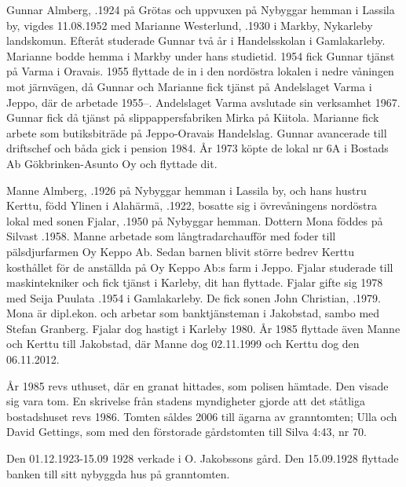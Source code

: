 Gunnar Almberg, .1924 på Grötas och uppvuxen på Nybyggar hemman i Lassila by, vigdes 11.08.1952 med Marianne Westerlund, .1930 i Markby, Nykarleby landskomun. Efteråt studerade Gunnar två år i Handelsskolan i Gamlakarleby. Marianne bodde hemma i Markby under hans studietid. 1954 fick Gunnar tjänst på Varma i Oravais. 1955 flyttade de in i den nordöstra lokalen i nedre våningen mot järnvägen, då Gunnar och Marianne fick tjänst på Andelslaget Varma i Jeppo, där de arbetade 1955--. Andelslaget Varma avslutade sin verksamhet 1967. Gunnar fick då tjänst på slippappersfabriken Mirka på Kiitola. Marianne fick arbete som butiksbiträde på Jeppo-Oravais Handelslag. Gunnar avancerade till driftschef och båda gick i pension 1984. År 1973 köpte de lokal nr 6A i Bostads Ab Gökbrinken-Asunto Oy och flyttade dit.

Manne Almberg, .1926 på Nybyggar hemman i Lassila by, och hans hustru Kerttu, född Ylinen i Alahärmä, .1922, bosatte sig i övrevåningens nordöstra lokal med sonen Fjalar, .1950 på Nybyggar hemman. Dottern Mona föddes på Silvast .1958. Manne arbetade som långtradarchaufför med foder till pälsdjurfarmen Oy Keppo Ab. Sedan barnen blivit större bedrev Kerttu kosthållet för de anställda på Oy Keppo Ab:s farm i Jeppo.  Fjalar studerade till maskintekniker och fick tjänst i Karleby, dit han flyttade. Fjalar gifte sig 1978 med Seija Puulata .1954 i Gamlakarleby. De fick sonen John Christian, .1979. Mona är dipl.ekon. och arbetar som banktjänsteman i Jakobstad, sambo med Stefan Granberg. Fjalar dog hastigt i Karleby 1980. År 1985 flyttade även Manne och Kerttu till Jakobstad, där Manne dog 02.11.1999 och Kerttu dog den 06.11.2012.

År 1985 revs uthuset, där en granat hittades, som polisen hämtade. Den visade sig vara tom. En skrivelse från stadens myndigheter gjorde att det ståtliga bostadshuset revs 1986. Tomten såldes 2006 till ägarna av granntomten; Ulla och David Gettings, som med den förstorade gårdstomten till Silva 4:43, nr 70.




Den 01.12.1923-15.09 1928 verkade  i O. Jakobssons gård. Den 15.09.1928 flyttade banken till sitt nybyggda hus på granntomten.

